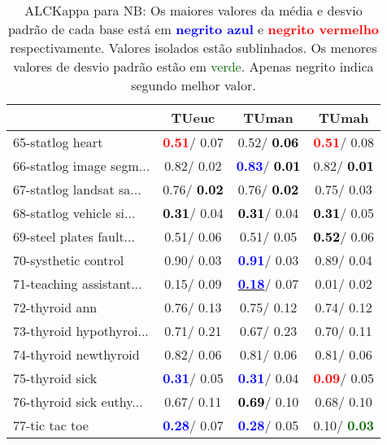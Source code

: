 \begin{table}[h]
\caption{ALCKappa para NB: Os maiores valores da média e desvio padrão de cada base está em \textcolor{blue}{\textbf{negrito azul}} e \textcolor{red}{\textbf{negrito vermelho}} respectivamente. Valores isolados estão sublinhados. Os menores valores de desvio padrão estão em \textcolor{darkgreen}{verde}. Apenas negrito indica segundo melhor valor.}
\begin{center}\begin{tabular}{lc|c|c}
 & TUeuc & TUman & TUmah\\ \hline 65-statlog heart & \textcolor{red}{\textbf{  0.51}}/  0.07 &   0.52/\textcolor{black}{\textbf{  0.06}} & \textcolor{red}{\textbf{  0.51}}/  0.08 \\
66-statlog image segm... &   0.82/  0.02 & \textcolor{blue}{\textbf{  0.83}}/\textcolor{black}{\textbf{  0.01}} &   0.82/\textcolor{black}{\textbf{  0.01}} \\
67-statlog landsat sa... &   0.76/\textcolor{black}{\textbf{  0.02}} &   0.76/\textcolor{black}{\textbf{  0.02}} &   0.75/  0.03 \\
68-statlog vehicle si... & \textcolor{black}{\textbf{  0.31}}/  0.04 & \textcolor{black}{\textbf{  0.31}}/  0.04 & \textcolor{black}{\textbf{  0.31}}/  0.05 \\
69-steel plates fault... &   0.51/  0.06 &   0.51/  0.05 & \textcolor{black}{\textbf{  0.52}}/  0.06 \\
70-systhetic control &   0.90/  0.03 & \textcolor{blue}{\textbf{  0.91}}/  0.03 &   0.89/  0.04 \\
71-teaching assistant... &   0.15/  0.09 & \underline{\textcolor{blue}{\textbf{  0.18}}}/  0.07 &   0.01/  0.02 \\ \hline
72-thyroid ann &   0.76/  0.13 &   0.75/  0.12 &   0.74/  0.12 \\
73-thyroid hypothyroi... &   0.71/  0.21 &   0.67/  0.23 &   0.70/  0.11 \\
74-thyroid newthyroid &   0.82/  0.06 &   0.81/  0.06 &   0.81/  0.06 \\
75-thyroid sick & \textcolor{blue}{\textbf{  0.31}}/  0.05 & \textcolor{blue}{\textbf{  0.31}}/  0.04 & \textcolor{red}{\textbf{  0.09}}/  0.05 \\
76-thyroid sick euthy... &   0.67/  0.11 & \textcolor{black}{\textbf{  0.69}}/  0.10 &   0.68/  0.10 \\
77-tic tac toe & \textcolor{blue}{\textbf{  0.28}}/  0.07 & \textcolor{blue}{\textbf{  0.28}}/  0.05 &   0.10/\textcolor{darkgreen}{\textbf{  0.03}} \\

\end{tabular}
\end{center}
\end{table}

